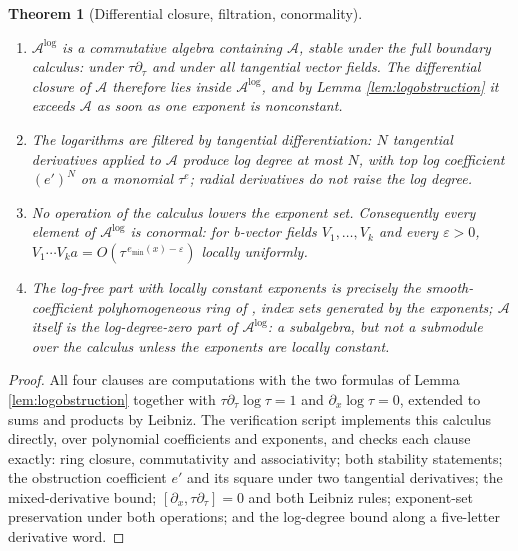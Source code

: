 \documentclass[11pt]{article}
\newtheorem{theorem}{Theorem}[section]
\theoremstyle{definition}
\begin{document}
\begin{theorem}[Differential closure, filtration, conormality]\label{thm:diffclosure}
\begin{enumerate}
\item $\mathcal{A}^{\log}$ is a commutative algebra containing $\mathcal{A}$, stable under the full boundary calculus: under $\tau\partial_\tau$ and under all tangential vector fields. The differential closure of $\mathcal{A}$ therefore lies inside $\mathcal{A}^{\log}$, and by Lemma \ref{lem:logobstruction} it exceeds $\mathcal{A}$ as soon as one exponent is nonconstant.
\item The logarithms are filtered by tangential differentiation: $N$ tangential derivatives applied to $\mathcal{A}$ produce log degree at most $N$, with top log coefficient $(e')^N$ on a monomial $\tau^{e}$; radial derivatives do not raise the log degree.
\item No operation of the calculus lowers the exponent set. Consequently every element of $\mathcal{A}^{\log}$ is conormal: for b-vector fields $V_1,\dots,V_k$ and every $\varepsilon>0$, $V_1\cdots V_k a = O(\tau^{\,e_{\min}(x)-\varepsilon})$ locally uniformly.
\item The log-free part with locally constant exponents is precisely the smooth-coefficient polyhomogeneous ring of \cite{Melrose1993}, index sets generated by the exponents; $\mathcal{A}$ itself is the log-degree-zero part of $\mathcal{A}^{\log}$: a subalgebra, but not a submodule over the calculus unless the exponents are locally constant.
\end{enumerate}
\end{theorem}

\begin{proof}
All four clauses are computations with the two formulas of Lemma \ref{lem:logobstruction} together with $\tau\partial_\tau \log\tau = 1$ and $\partial_x\log\tau = 0$, extended to sums and products by Leibniz. The verification script implements this calculus directly, over polynomial coefficients and exponents, and checks each clause exactly: ring closure, commutativity and associativity; both stability statements; the obstruction coefficient $e'$ and its square under two tangential derivatives; the mixed-derivative bound; $[\partial_x, \tau\partial_\tau]=0$ and both Leibniz rules; exponent-set preservation under both operations; and the log-degree bound along a five-letter derivative word.
\end{proof}
\end{document}
